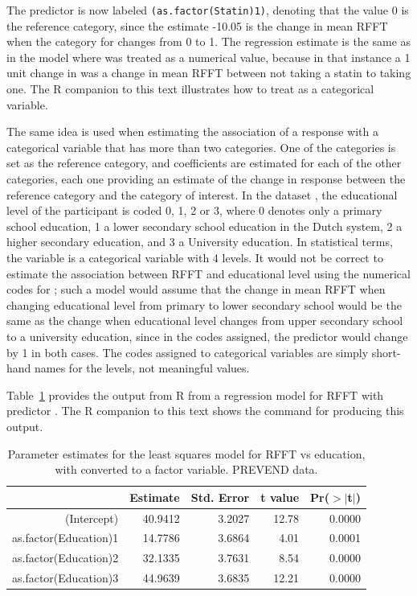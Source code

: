 The predictor is now labeled \texttt{(as.factor(Statin)1)}, denoting that the value 0 is the reference category, since the estimate -10.05 is the change in mean RFFT when the category for  changes from 0 to 1.  The regression estimate is the same as in the model where  was treated as a numerical value, because in that instance a 1 unit change in  was a change in mean RFFT between not taking a statin to taking one.  The \textsf{R} companion to this text illustrates how to treat  as a categorical variable.

The same idea is used when estimating the association of a response with a categorical variable that has more than two categories.  One of the categories is set as the reference category, and coefficients are estimated for each of the other categories, each one providing an estimate of the change in response between the reference category and the category of interest.  In the dataset , the educational level of the participant is coded 0, 1, 2 or 3, where 0 denotes only a primary school education, 1 a lower secondary school education in the Dutch system, 2 a higher secondary education, and 3 a University education.   In statistical terms, the variable  is a categorical variable with 4 levels.  It would not be correct to estimate the association between RFFT and educational level using the numerical codes for ; such a model would assume that the change in mean RFFT when changing educational level from primary to lower secondary school would be the same as the change when educational level changes from upper secondary school to a university education, since in the codes assigned, the predictor would change by 1 in both cases.  The codes assigned to categorical variables are simply short-hand names for the levels, not meaningful values.  

Table~\ref{RFFTEducationRegression} provides the output from \textsf{R} from a regression model for RFFT with predictor .  The \textsf{R} companion to this text shows the command for producing this output.

\begin{table}[ht]
\centering
\begin{tabular}{rrrrr}
  \hline
 & Estimate & Std. Error & t value & Pr($>$$|$t$|$) \\ 
  \hline
(Intercept) & 40.9412 & 3.2027 & 12.78 & 0.0000 \\ 
  as.factor(Education)1 & 14.7786 & 3.6864 & 4.01 & 0.0001 \\ 
  as.factor(Education)2 & 32.1335 & 3.7631 & 8.54 & 0.0000 \\ 
  as.factor(Education)3 & 44.9639 & 3.6835 & 12.21 & 0.0000 \\ 
   \hline
\end{tabular}
\caption{Parameter estimates for the least squares model for RFFT vs education, with  converted to a factor variable. PREVEND data.}
\label{RFFTEducationRegression}
\end{table}

